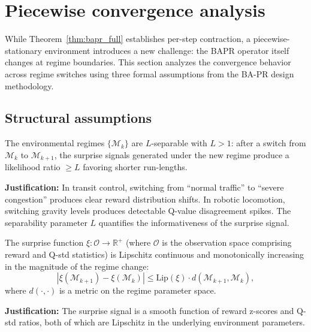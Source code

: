 \section{Piecewise convergence analysis}
\label{app:piecewise_convergence}

While Theorem~\ref{thm:bapr_full} establishes per-step contraction, a piecewise-stationary environment introduces a new challenge: the BAPR operator itself changes at regime boundaries. This section analyzes the convergence behavior across regime switches using three formal assumptions from the BA-PR design methodology.

\subsection{Structural assumptions}

\begin{assumption}
    \label{assump:separability}
    The environmental regimes $\{\mathcal{M}_k\}$ are $L$-separable with $L > 1$: after a switch from $\mathcal{M}_k$ to $\mathcal{M}_{k+1}$, the surprise signals generated under the new regime produce a likelihood ratio $\geq L$ favoring shorter run-lengths.
    
    \textbf{Justification:} In transit control, switching from ``normal traffic'' to ``severe congestion'' produces clear reward distribution shifts. In robotic locomotion, switching gravity levels produces detectable Q-value disagreement spikes. The separability parameter $L$ quantifies the informativeness of the surprise signal.
\end{assumption}

\begin{assumption}
    \label{assump:lipschitz_surprise}
    The surprise function $\xi: \mathcal{O} \to \mathbb{R}^+$ (where $\mathcal{O}$ is the observation space comprising reward and Q-std statistics) is Lipschitz continuous and monotonically increasing in the magnitude of the regime change:
    \begin{equation}
        |\xi(\mathcal{M}_{k+1}) - \xi(\mathcal{M}_k)| \le \text{Lip}(\xi) \cdot d(\mathcal{M}_{k+1}, \mathcal{M}_k),
    \end{equation}
    where $d(\cdot, \cdot)$ is a metric on the regime parameter space.
    
    \textbf{Justification:} The surprise signal is a smooth function of reward z-scores and Q-std ratios, both of which are Lipschitz in the underlying environment parameters.
\end{assumption}

